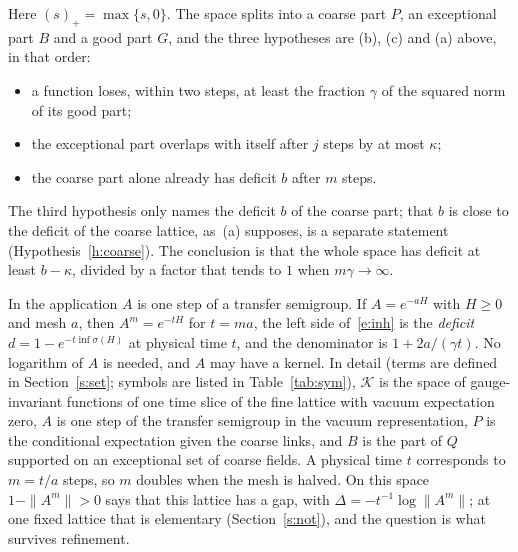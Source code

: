 Here $(s)_+=\max\{s,0\}$. The space splits into a coarse part $P$, an exceptional part $B$ and a good part
$G$, and the three hypotheses are (b), (c) and (a) above, in that order:
\begin{itemize}
\item a function loses, within two steps, at least the fraction $\gamma$ of the squared norm of its good
part;
\item the exceptional part overlaps with itself after $j$ steps by at most $\kappa$;
\item the coarse part alone already has deficit $b$ after $m$ steps.
\end{itemize}
The third hypothesis only names the deficit $b$ of the coarse part; that $b$ is close to the deficit of the
coarse lattice, as~(a) supposes, is a separate statement (Hypothesis~\ref{h:coarse}).
The conclusion is that the whole space has deficit at least $b-\kappa$, divided by a factor that tends to $1$
when $m\gamma\to\infty$.

In the application $A$ is one step of a transfer semigroup. If $A=e^{-aH}$ with $H\ge0$ and mesh $a$, then
$A^m=e^{-tH}$ for $t=ma$, the left side of~\eqref{e:inh} is the \emph{deficit} $d=1-e^{-t\inf\sigma(H)}$ at
physical time $t$, and the denominator is $1+2a/(\gamma t)$. No logarithm of $A$ is needed, and $A$ may have
a kernel. In detail (terms are defined in Section~\ref{s:set}; symbols are listed in Table~\ref{tab:sym}),
$\mathcal K$ is the space of gauge-invariant functions of one time slice of the fine lattice with vacuum
expectation zero, $A$ is one step of the transfer semigroup in the vacuum representation, $P$ is the
conditional expectation given the coarse links, and $B$ is the part of $Q$ supported on an exceptional set of
coarse fields. A physical time $t$ corresponds to $m=t/a$ steps, so $m$ doubles when the mesh is halved. On
this space $1-\|A^m\|>0$ says that this lattice has a gap, with $\Delta=-t^{-1}\log\|A^m\|$; at one fixed
lattice that is elementary (Section~\ref{s:not}), and the question is what survives refinement.

